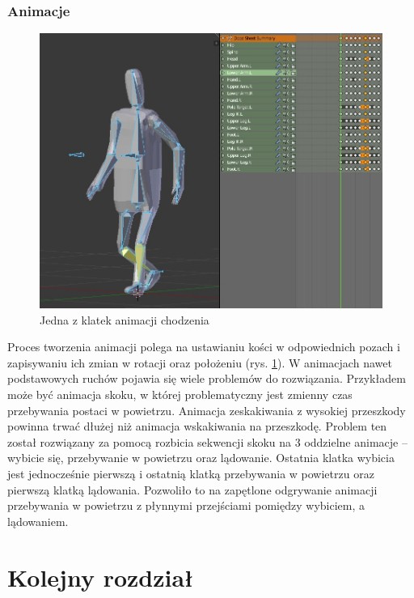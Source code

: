 \documentclass[multip]{SGGW-thesis}
\begin{document}
	\subsection{Animacje}
\begin{figure}
		\centering
			\includegraphics[width=1\textwidth]{figures/adiwalk.jpg}
		\caption{Jedna z klatek animacji chodzenia}
		\label{blender-anim}
\end{figure}
Proces tworzenia animacji polega na ustawianiu kości w odpowiednich pozach i zapisywaniu ich zmian w rotacji oraz położeniu (rys. \ref{blender-anim}). 
W animacjach nawet podstawowych ruchów pojawia się wiele problemów do rozwiązania. Przykładem może być animacja skoku, w której problematyczny jest zmienny czas przebywania postaci w powietrzu. Animacja zeskakiwania z wysokiej przeszkody powinna trwać dłużej niż animacja wskakiwania na przeszkodę. Problem ten został rozwiązany za pomocą rozbicia sekwencji skoku na 3 oddzielne animacje – wybicie się, przebywanie w powietrzu oraz lądowanie. Ostatnia klatka wybicia jest jednocześnie pierwszą i ostatnią klatką przebywania w powietrzu oraz pierwszą klatką lądowania. Pozwoliło to na zapętlone odgrywanie animacji przebywania w powietrzu z płynnymi przejściami pomiędzy wybiciem, a lądowaniem.


\chapter{Kolejny rozdział}
\end{document}
